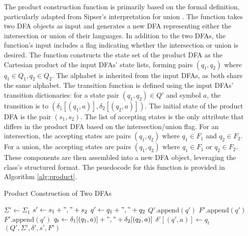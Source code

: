 \documentclass[conference]{IEEEtran}
\begin{document}
The product construction function is primarily based on the formal definition, particularly adapted from Sipser's interpretation for union \cite{b1}. The function takes two DFA objects as input and generates a new DFA representing either the intersection or union of their languages. In addition to the two DFAs, the function's input includes a flag indicating whether the intersection or union is desired. The function constructs the state set of the product DFA as the Cartesian product of the input DFAs' state lists, forming pairs $(q_1, q_2)$ where $q_1 \in Q_1, q_2 \in Q_2$. The alphabet is inherited from the input DFAs, as both share the same alphabet. The transition function is defined using the input DFAs' transition dictionaries: for a state pair $(q_1, q_2) \in Q'$ and symbol $a$, the transition is to $(\delta_1[(q_1, a)], \delta_2[(q_2, a)])$. The initial state of the product DFA is the pair $(s_1, s_2)$. The list of accepting states is the only attribute that differs in the product DFA based on the intersection/union flag. For an intersection, the accepting states are pairs $(q_1, q_2)$ where $q_1 \in F_1$ and $q_2 \in F_2$. For a union, the accepting states are pairs $(q_1, q_2)$ where $q_1 \in F_1$ or $q_2 \in F_2$. These components are then assembled into a new DFA object, leveraging the class's structured format. The psuedocode for this function is provided in Algorithm \ref{alg:product}.

\begin{algorithm}
\caption{Product Construction of Two DFAs}
\label{alg:product}
\begin{algorithmic}
\State $\Sigma' \gets \Sigma_1$
\State $s' \gets s_1 + "," + s_2$
        \State $q' \gets q_1 + "," + q_2$
        \State $Q'.\text{append}(q')$
                \State $F'.\text{append}(q')$
            \EndIf
        \EndIf
                \State $F'.\text{append}(q')$
            \EndIf
        \EndIf
            \State $q_t \gets \delta_1[(q_1, a)] + "," + \delta_2[(q_2, a)]$
            \State $\delta'[(q', a)] \gets q_t$
        \EndFor
    \EndFor
\EndFor
\State \Return {}$(Q', \Sigma', \delta', s', F')$
\end{algorithmic}
\end{algorithm}
\end{document}
